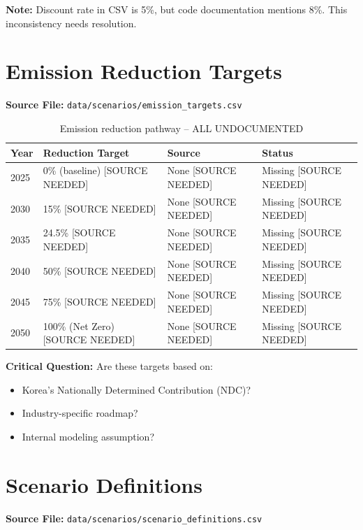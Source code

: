 \documentclass[12pt,a4paper]{article}
\newcommand{\nosource}[1]{\textcolor{sourcered}{#1 [SOURCE NEEDED]}}
\begin{document}
\textbf{Note:} Discount rate in CSV is 5\%, but code documentation mentions 8\%. This inconsistency needs resolution.

\section{Emission Reduction Targets}
\label{sec:targets}

\textbf{Source File:} \texttt{data/scenarios/emission\_targets.csv}

\begin{table}[H]
\centering
\begin{tabular}{llll}
\toprule
\textbf{Year} & \textbf{Reduction Target} & \textbf{Source} & \textbf{Status} \\
\midrule
2025 & \nosource{0\% (baseline)} & \nosource{None} & \nosource{Missing} \\
2030 & \nosource{15\%} & \nosource{None} & \nosource{Missing} \\
2035 & \nosource{24.5\%} & \nosource{None} & \nosource{Missing} \\
2040 & \nosource{50\%} & \nosource{None} & \nosource{Missing} \\
2045 & \nosource{75\%} & \nosource{None} & \nosource{Missing} \\
2050 & \nosource{100\% (Net Zero)} & \nosource{None} & \nosource{Missing} \\
\bottomrule
\end{tabular}
\caption{Emission reduction pathway -- \textcolor{sourcered}{ALL UNDOCUMENTED}}
\end{table}

\textbf{Critical Question:} Are these targets based on:
\begin{itemize}
    \item Korea's Nationally Determined Contribution (NDC)?
    \item Industry-specific roadmap?
    \item Internal modeling assumption?
\end{itemize}

\section{Scenario Definitions}
\label{sec:scenarios}

\textbf{Source File:} \texttt{data/scenarios/scenario\_definitions.csv}
\end{document}
